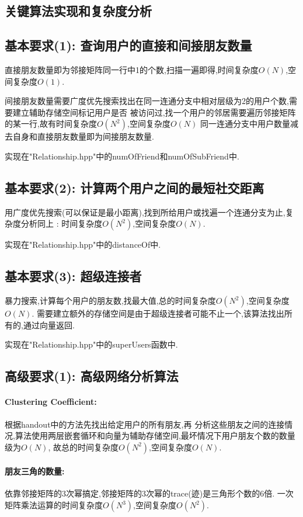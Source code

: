 \documentclass{article}
\begin{document}
\begin{CJK*}{UTF8}{gbsn}
\section{关键算法实现和复杂度分析}
\subsection{基本要求(1): 查询用户的直接和间接朋友数量}
\par 直接朋友数量即为邻接矩阵同一行中1的个数,扫描一遍即得,时间复杂度$O(N)$,空间复杂度$O(1)$.
\par 间接朋友数量需要广度优先搜索找出在同一连通分支中相对层级为2的用户个数,需要建立辅助存储空间标记用户是否
被访问过,找一个用户的邻居需要遍历邻接矩阵的某一行,故有时间复杂度$O(N^2)$,空间复杂度$O(N)$
同一连通分支中用户数量减去自身和直接朋友数量即为间接朋友数量.
\par 实现在"Relationship.hpp"中的numOfFriend和numOfSubFriend中.
\subsection{基本要求(2): 计算两个用户之间的最短社交距离}
\par 用广度优先搜索(可以保证是最小距离),找到所给用户或找遍一个连通分支为止,复杂度分析同上
: 时间复杂度$O(N^2)$,空间复杂度$O(N)$.
\par 实现在"Relationship.hpp"中的distanceOf中.
\subsection{基本要求(3): 超级连接者}
\par 暴力搜索,计算每个用户的朋友数,找最大值,总的时间复杂度$O(N^2)$,空间复杂度$O(N)$.
需要建立额外的存储空间是由于超级连接者可能不止一个,该算法找出所有的,通过向量返回.
\par 实现在"Relationship.hpp"中的superUsers函数中.
\subsection{高级要求(1): 高级网络分析算法}
\paragraph{Clustering Coefficient: } 根据handout中的方法先找出给定用户的所有朋友,再
分析这些朋友之间的连接情况,算法使用两层嵌套循环和向量为辅助存储空间,最坏情况下用户朋友个数的数量级为$O(N)$,
故总的时间复杂度$O(N^2)$,空间复杂度$O(N)$.
\paragraph{朋友三角的数量: }依靠邻接矩阵的3次幂搞定,邻接矩阵的3次幂的trace(迹)是三角形个数的6倍.
一次矩阵乘法运算的时间复杂度$O(N^3)$,空间复杂度$O(N^2)$.

\end{CJK*}
\end{document}
